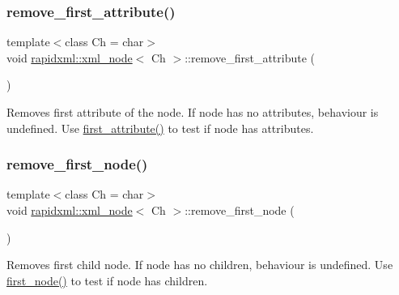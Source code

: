\subsubsection{\texorpdfstring{remove\+\_\+first\+\_\+attribute()}{remove\_first\_attribute()}}
{\footnotesize\ttfamily template$<$class Ch = char$>$ \\
void \mbox{\hyperlink{classrapidxml_1_1xml__node}{rapidxml\+::xml\+\_\+node}}$<$ Ch $>$\+::remove\+\_\+first\+\_\+attribute (\begin{DoxyParamCaption}{ }\end{DoxyParamCaption})\hspace{0.3cm}{\ttfamily [inline]}}

Removes first attribute of the node. If node has no attributes, behaviour is undefined. Use \mbox{\hyperlink{classrapidxml_1_1xml__node_ab816ab6f13ee4b0588d5b76b0697511c}{first\+\_\+attribute()}} to test if node has attributes. \mbox{\label{classrapidxml_1_1xml__node_a62bf7b276cf7a651a3337f5e0a0ef6ac}} 
\subsubsection{\texorpdfstring{remove\+\_\+first\+\_\+node()}{remove\_first\_node()}}
{\footnotesize\ttfamily template$<$class Ch = char$>$ \\
void \mbox{\hyperlink{classrapidxml_1_1xml__node}{rapidxml\+::xml\+\_\+node}}$<$ Ch $>$\+::remove\+\_\+first\+\_\+node (\begin{DoxyParamCaption}{ }\end{DoxyParamCaption})\hspace{0.3cm}{\ttfamily [inline]}}

Removes first child node. If node has no children, behaviour is undefined. Use \mbox{\hyperlink{classrapidxml_1_1xml__node_acdf3691224d683f50692616a92a75d3f}{first\+\_\+node()}} to test if node has children. \mbox{\label{classrapidxml_1_1xml__node_a1781a2cbedc9a51d609ad5b528125635}} 
